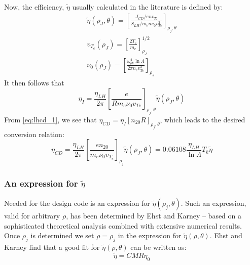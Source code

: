 Now, the efficiency, $\tilde \eta$ usually calculated in the literature is defined by:
\begin{gather}
	\tilde { \eta } \left( \rho _ { J } , \theta \right) = \left[ \frac { J _ { C D } / e n v _ { T _ { e } } } { S _ { L H } / m _ { e } n \nu _ { 0 } v _ { T e } ^ { 2 } } \right] _ { \rho _ { j } , \theta } \\
	v _ { T _ { e } } \left( \rho _ { J } \right) = \left[ \frac { 2 T _ { e } } { m _ { e } } \right] _ { \rho _ { J } } ^ { 1 / 2 } \\
	\nu _ { 0 } \left( \rho _ { J } \right) = \left[ \frac { \omega _ { p e } ^ { 4 } \ln \Lambda } { 2 \pi n _ { e } v _ { T e } ^ { 3 } } \right] _ { \rho _ { J } }
\end{gather}
It then follows that
\begin{equation}
	\eta _ { I } = \frac { \eta _ { L H } } { 2 \pi } \left[ \frac { e } { R m _ { e } \nu _ { 0 } v _ { T e } } \right] _ { \rho _ { j } , \theta } \tilde { \eta } \left( \rho _ { J } , \theta \right)
\end{equation}
From \cref{eq:lhcd_1}, we see that $\eta _ { C D } = \eta _ { I } \left[ n _ { 20 } R \right] _ { \rho _ { j } , \theta }$, which leads to the desired conversion relation:
\begin{equation}
	\eta _ { C D } = \frac { \eta _ { L H } } { 2 \pi } \left[ \frac { e n _ { 20 } } { m _ { e } \nu _ { 0 } v _ { T _ { e } } } \right] _ { \rho _ { j } } \tilde { \eta } \left( \rho _ { J } , \theta \right) = 0.06108 \frac { \eta _ { L H } } { \ln \Lambda } T _ { k } \tilde { \eta }
\end{equation}

\subsubsection{An expression for $\tilde \eta$}

Needed for the design code is an expression for $\tilde \eta(\rho_j, \theta)$. Such an expression, valid for arbitrary $\rho$, has been determined by Ehst and Karney\cite{ehstkarney} -- based on a sophisticated theoretical analysis combined with extensive numerical results. Once $\rho_j$ is determined we set $\rho = \rho_j$ in the expression for $\tilde \eta(\rho,\theta).$ Ehst and Karney find that a good fit for $\tilde \eta(\rho,\theta)$ can be written as:
\begin{equation}
	\label{eq:lhcd_2}
	\tilde { \eta } = C M R \eta _ { 0 }
\end{equation}


